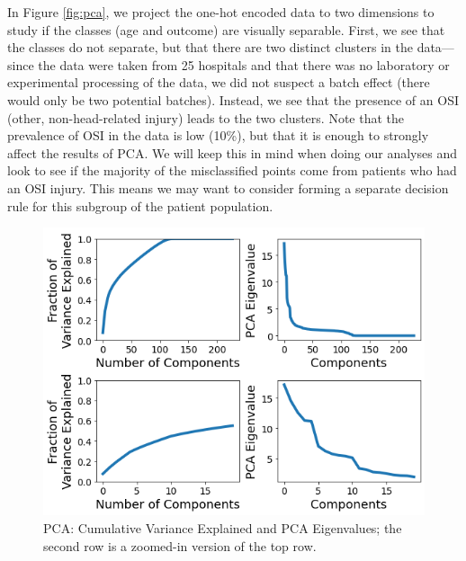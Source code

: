 \documentclass[11pt, letterpaper]{amsart}
\begin{document}
In Figure \ref{fig:pca}, we project the one-hot encoded data to two dimensions to study if the classes (age and outcome) are visually separable. First, we see that the classes do not separate, but that there are two distinct clusters in the data---since the data were taken from 25 hospitals and that there was no laboratory or experimental processing of the data, we did not suspect a batch effect (there would only be two potential batches). Instead, we see that the presence of an OSI (other, non-head-related injury) leads to the two clusters. Note that the prevalence of OSI in the data is low (10\%), but that it is enough to strongly affect the results of PCA. We will keep this in mind when doing our analyses and look to see if the majority of the misclassified points come from patients who had an OSI injury. This means we may want to consider forming a separate decision rule for this subgroup of the patient population.
\begin{figure}
	\centering
	\includegraphics[width=\textwidth]{pca_cum_var.png}
	\caption{PCA: Cumulative Variance Explained and PCA Eigenvalues; the second row is a zoomed-in version of the top row. }\label{fig:pca_cum_var}
\end{figure}
\end{document}
